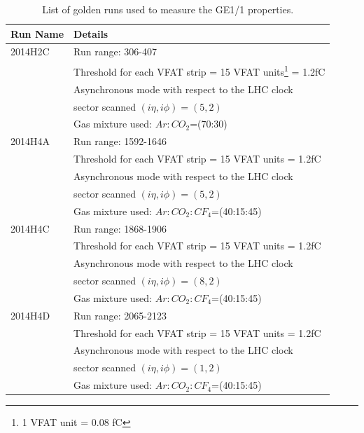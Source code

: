 \begin{table}
\begin{tabular}[!htbp]{l l}
\hline
\textbf{Run Name}   &   \textbf{Details}\\
\hline
2014H2C     & Run range: 306-407    \\
            & Threshold for each VFAT strip = 15 VFAT units\footnote{1 VFAT unit = 0.08 fC} = 1.2fC\\
            & Asynchronous mode with respect to the LHC clock \\
            & sector scanned $(i\eta, i\phi)=(5,2)$\\
            & Gas mixture used: $Ar:CO_{2}$=(70:30)\\
\hline
2014H4A     & Run range: 1592-1646 \\
            & Threshold for each VFAT strip = 15 VFAT units = 1.2fC\\
            & Asynchronous mode with respect to the LHC clock \\
            & sector scanned $(i\eta, i\phi)=(5,2)$\\
            & Gas mixture used: $Ar:CO_{2}:CF_4$=(40:15:45)\\
\hline
2014H4C     & Run range: 1868-1906 \\
            & Threshold for each VFAT strip = 15 VFAT units = 1.2fC\\
            & Asynchronous mode with respect to the LHC clock \\
            & sector scanned $(i\eta, i\phi)=(8,2)$\\
            & Gas mixture used: $Ar:CO_{2}:CF_4$=(40:15:45)\\
\hline
2014H4D     & Run range: 2065-2123 \\
            & Threshold for each VFAT strip = 15 VFAT units = 1.2fC\\
            & Asynchronous mode with respect to the LHC clock \\
            & sector scanned $(i\eta, i\phi)=(1,2)$\\             
            & Gas mixture used: $Ar:CO_{2}:CF_4$=(40:15:45)\\
\hline
\end{tabular}
\caption{List of golden runs used to measure the GE1/1 properties.}
\label{tab:gemTBgoldenruns}
\end{table}
